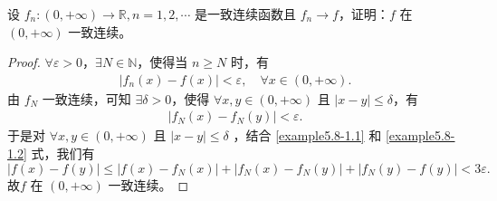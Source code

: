 \documentclass[../../main.tex]{subfiles}%
\begin{document}
\begin{example}
设 \( f_n : (0, +\infty) \to \mathbb{R}, n = 1, 2, \cdots \) 是一致连续函数且 \( f_n \rightarrow f \)，证明：\( f \) 在 \( (0, +\infty) \) 一致连续。
\end{example}
\begin{proof}

$\forall \varepsilon > 0$，$\exists N \in \mathbb{N}$，使得当 $n \geqslant N$ 时，有
\begin{align}
\left| f_n\left( x \right) - f\left( x \right) \right| < \varepsilon, \quad \forall x \in \left( 0, +\infty \right). \label{example5.8-1.1}
\end{align}
由 $f_N$ 一致连续，可知 $\exists \delta > 0$，使得 $\forall x, y \in \left( 0, +\infty \right)$ 且 $\left| x - y \right| \leqslant \delta$，有
\begin{align}
\left| f_N\left( x \right) - f_N\left( y \right) \right| < \varepsilon. \label{example5.8-1.2}
\end{align}
于是对 $\forall x, y \in \left( 0, +\infty \right)$ 且 $\left| x - y \right| \leqslant \delta$ ，结合 \eqref{example5.8-1.1} 和 \eqref{example5.8-1.2} 式，我们有
\[
\left| f\left( x \right) - f\left( y \right) \right| \leqslant \left| f\left( x \right) - f_N\left( x \right) \right| + \left| f_N\left( x \right) - f_N\left( y \right) \right| + \left| f_N\left( y \right) - f\left( y \right) \right| < 3\varepsilon.
\]
故\( f \) 在 \( (0, +\infty) \) 一致连续。

\end{proof}
\end{document}
